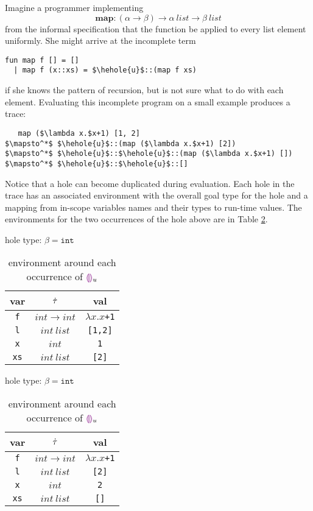 Imagine a programmer implementing $$\mathbf{map} : (\alpha \to \beta) \to
\alpha ~\mathit{list} \to \beta ~\mathit{list}$$ from the informal
specification that the function be applied to every list element uniformly.
She might arrive at the incomplete term
\begin{lstlisting}
fun map f [] = []
  | map f (x::xs) = $\hehole{u}$::(map f xs)
\end{lstlisting}
if she knows the pattern of recursion, but is not sure what to do with each
element. Evaluating this incomplete program on a small example produces a
trace:
\begin{lstlisting}
   map ($\lambda x.$x+1) [1, 2]
$\mapsto^*$ $\hehole{u}$::(map ($\lambda x.$x+1) [2])
$\mapsto^*$ $\hehole{u}$::$\hehole{u}$::(map ($\lambda x.$x+1) [])
$\mapsto^*$ $\hehole{u}$::$\hehole{u}$::[]
\end{lstlisting}
Notice that a hole can become duplicated during evaluation. Each hole in
the trace has an associated environment with the overall goal type for the
hole and a mapping from in-scope variables names and their types to
run-time values. The environments for the two occurrences of the hole above
are in Table \ref{tabx}.

\begin{table}[h!]
  \begin{subtable}{.5\linewidth}
    \caption{hole type: $\beta=\texttt{int}$}
    \centering
        {
          \footnotesize
          \begin{tabular}{c|c|c}
            var & $\dot{\tau}$ & val\\
            \hline
            \texttt{f} & $int \to int$ & $\lambda x.x$\texttt{+1}\\
            \texttt{l} & $int ~list$ & \texttt{[1,2]}\\
            \texttt{x} & $int$ & \texttt{1}\\
            \texttt{xs} & $int ~list$ & \texttt{[2]}\\
          \end{tabular}
        }
  \end{subtable}%
  \begin{subtable}{.5\linewidth}
    \caption{hole type: $\beta=\texttt{int}$}
    \centering
        {
          \footnotesize
          \begin{tabular}{c|c|c}
            var & $\dot{\tau}$ & val\\
            \hline
            \texttt{f} & $int \to int$ & $\lambda x.x$\texttt{+1}\\
            \texttt{l} & $int ~list$ & \texttt{[2]}\\
            \texttt{x} & $int$ & \texttt{2}\\
            \texttt{xs} & $int ~list$ & \texttt{[]}\\
          \end{tabular}
        }
  \end{subtable}
  \caption{environment around each occurrence of $\textcolor{violet}{\llparenthesis}\textcolor{violet}{\rrparenthesis}_{u}$}
  \label{tabx}
\end{table}

